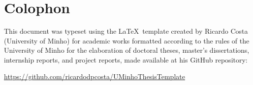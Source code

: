 
\null
\vfill

\section*{Colophon}

\noindent This document was typeset using the \LaTeX\ template created by Ricardo Costa (University of Minho) for academic works formatted according to the rules of the University of Minho for the elaboration of doctoral theses, master's dissertations, internship reports, and project reports, made available at his GitHub repository:

\begin{center}
\small
\url{https://github.com/ricardodpcosta/UMinhoThesisTemplate}
\end{center}

